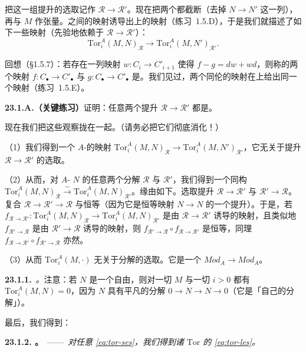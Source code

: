 把这一组提升的选取记作 $\mathscr{R}\to\mathscr{R}'$。现在把两个\trComplexes{}都截断（去掉 $N\to N'$ 这一列），再与 $M$ 作张量。\trComplexes{}之间的映射诱导出\trHomology{}上的映射（\mbox{练习~1.5.D}），于是我们就描述了如下一些映射（先验地依赖于 $\mathscr{R}\to\mathscr{R}'$）：
\[
\mathrm{Tor}^A_i(M,N)_{\mathscr{R}} \longrightarrow \mathrm{Tor}^A_i(M,N')_{\mathscr{R}'}.
\]

回想（\S1.5.7）：若存在一列映射 $w\colon C_i\to C'_{i+1}$ 使得 $f-g=dw+wd$，则称\trComplexes{}的两个映射 $f\colon C_\bullet\to C'_\bullet$ 与 $g\colon C_\bullet\to C'_\bullet$ 是\trHomotopic。我们见过，两个同伦的映射在\trHomology{}上给出同一个映射（\mbox{练习~1.5.E}）。

\textbf{23.1.A.（关键练习）}\quad 证明：任意两个提升 $\mathscr{R}\to\mathscr{R}'$ 都是\trHomotopic。

现在我们把这些观察拢在一起。（请务必把它们彻底消化！）

（1）我们得到一个 $A$-\trModule{}的映射 $\mathrm{Tor}^A_i(M,N)_{\mathscr{R}}\to\mathrm{Tor}^A_i(M,N')_{\mathscr{R}'}$，它无关于提升 $\mathscr{R}\to\mathscr{R}'$ 的选取。

（2）从而，对 $A$-\trModule{} $N$ 的任意两个分解 $\mathscr{R}$ 与 $\mathscr{R}'$，我们得到一个\emph{\trCanonical}同构 $\mathrm{Tor}^A_i(M,N)_{\mathscr{R}}\overset{\sim}{\longrightarrow}\mathrm{Tor}^A_i(M,N)_{\mathscr{R}'}$。缘由如下。选取提升 $\mathscr{R}\to\mathscr{R}'$ 与 $\mathscr{R}'\to\mathscr{R}$。复合 $\mathscr{R}\to\mathscr{R}'\to\mathscr{R}$ 与恒等\trHomotopy（因为它是恒等映射 $N\to N$ 的一个提升）。于是，若 $f_{\mathscr{R}\to\mathscr{R}'}\colon\mathrm{Tor}^A_i(M,N)_{\mathscr{R}}\to\mathrm{Tor}^A_i(M,N)_{\mathscr{R}'}$ 是由 $\mathscr{R}\to\mathscr{R}'$ 诱导的映射，且类似地 $f_{\mathscr{R}'\to\mathscr{R}}$ 是由 $\mathscr{R}'\to\mathscr{R}$ 诱导的映射，则 $f_{\mathscr{R}'\to\mathscr{R}}\circ f_{\mathscr{R}\to\mathscr{R}'}$ 是恒等，同理 $f_{\mathscr{R}\to\mathscr{R}'}\circ f_{\mathscr{R}'\to\mathscr{R}}$ 亦然。

（3）从而 $\mathrm{Tor}^A_i(M,\cdot)$ 无关于分解的选取。它是一个\trCovariantFunctor{} $\mathit{Mod}_A\to\mathit{Mod}_A$。

\textbf{23.1.1.}\ \emph{\trhRemark。}\quad 注意：若 $N$ 是一个自由\trModule，则对一切 $M$ 与一切 $i>0$ 都有 $\mathrm{Tor}^A_i(M,N)=0$，因为 $N$ 具有平凡的分解 $0\to N\to N\to 0$（它是「自己的分解」）。

最后，我们得到\trLongExactSequence：

\textbf{23.1.2. \trhProposition。}\ ——\ \emph{对任意\trShortExactSequence{} \eqref{eq:tor-ses}，我们得到诸 $\mathrm{Tor}$ 的\trLongExactSequence{} \eqref{eq:tor-les}。}

